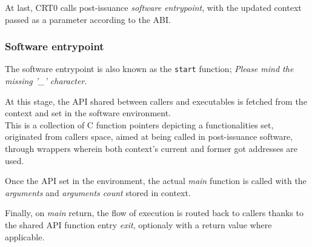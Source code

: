 \documentclass[10pt,a4paper,titlepage]{refart}
\begin{document}
At last, CRT0 calls post-issuance \textit{software entrypoint}, with the updated context passed as a parameter according to the ABI.

\subsubsection{Software entrypoint}
The software entrypoint is also known as the \texttt{start} function; \textit{Please mind the missing '\_' character}.

At this stage, the API shared between callers and executables is fetched from the context and set in the software environment.\\
This is a collection of C function pointers depicting a functionalities set, originated from callers space, aimed at being called
in post-issuance software, through wrappers wherein both context's current and former got addresses are used.

Once the API set in the environment, the actual \textit{main} function is called with the \textit{arguments} and \textit{arguments count} stored in context.

Finally, on \textit{main} return, the flow of execution is routed back to callers thanks to the shared API function entry \textit{exit}, optionaly
with a return value where applicable.
\end{document}
